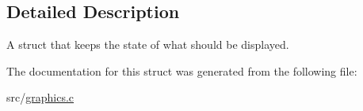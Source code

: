\subsection{Detailed Description}
A struct that keeps the state of what should be displayed. 

The documentation for this struct was generated from the following file\+:\begin{DoxyCompactItemize}
\item 
src/\hyperlink{graphics_8c}{graphics.\+c}\end{DoxyCompactItemize}
